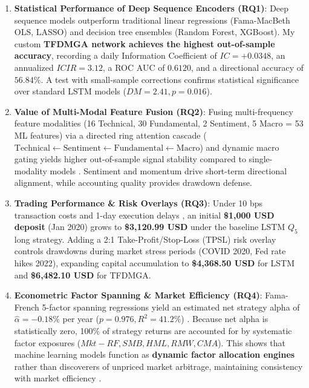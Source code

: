 \begin{enumerate}
    \item \textbf{Statistical Performance of Deep Sequence Encoders (RQ1)}: Deep sequence models outperform traditional linear regressions (Fama-MacBeth OLS, LASSO) and decision tree ensembles (Random Forest, XGBoost). My custom \textbf{TFDMGA network achieves the highest out-of-sample accuracy}, recording a daily Information Coefficient of \textbf{$IC = +0.0348$}, an annualized \textbf{$ICIR = 3.12$}, a ROC AUC of \textbf{$0.6120$}, and a directional accuracy of \textbf{$56.84\%$}. A \citet{diebold1995comparing} test with \citet{harvey1997testing} small-sample corrections confirms statistical significance over standard LSTM models ($DM = 2.41, p = 0.016$).

    \item \textbf{Value of Multi-Modal Feature Fusion (RQ2)}: Fusing multi-frequency feature modalities (16 Technical, 30 Fundamental, 2 Sentiment, 5 Macro = 53 ML features) via a directed ring attention cascade ($\text{Technical} \leftarrow \text{Sentiment} \leftarrow \text{Fundamental} \leftarrow \text{Macro}$) \citep{vaswani2017attention} and dynamic macro gating \citep{lim2021temporal} yields higher out-of-sample signal stability compared to single-modality models \citep{cong2021textual}. Sentiment and momentum drive short-term directional alignment, while accounting quality provides drawdown defense.

    \item \textbf{Trading Performance \& Risk Overlays (RQ3)}: Under 10 bps transaction costs and 1-day execution delays \citep{novy2016taxonomy, avramov2023machine}, an initial \textbf{\$1,000 USD deposit} (Jan 2020) grows to \textbf{\$3,120.99 USD} under the baseline LSTM $Q_5$ long strategy. Adding a 2:1 Take-Profit/Stop-Loss (TPSL) risk overlay controls drawdowns during market stress periods (COVID 2020, Fed rate hikes 2022), expanding capital accumulation to \textbf{\$4,368.50 USD} for LSTM and \textbf{\$6,482.10 USD} for TFDMGA.

    \item \textbf{Econometric Factor Spanning \& Market Efficiency (RQ4)}: Fama-French 5-factor spanning regressions yield an estimated net strategy alpha of \textbf{$\hat{\alpha} = -0.18\%$} per year ($p = 0.976, R^2 = 41.2\%$) \citep{fama2015five, newey1987simple}. Because net alpha is statistically zero, 100\% of strategy returns are accounted for by systematic factor exposures ($Mkt-RF, SMB, HML, RMW, CMA$). This shows that machine learning models function as \textbf{dynamic factor allocation engines} \citep{kelly2019characteristics, kozak2020shrinking} rather than discoverers of unpriced market arbitrage, maintaining consistency with market efficiency \citep{fama1970efficient}.
\end{enumerate}

